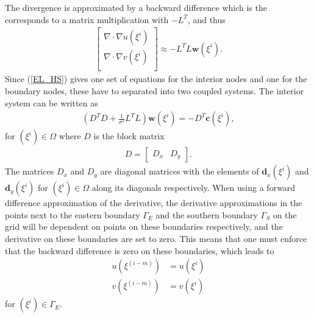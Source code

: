 The divergence is approximated by a backward difference which is the corresponds to a matrix multiplication with $-L^T$, and thus
\begin{align*}
 \begin{bmatrix}
         \nabla \cdot \nabla u(\xi^i) \\
         \nabla \cdot \nabla v(\xi^i)  \\
        \end{bmatrix} \approx -L^TL \textbf{w}(\xi^i).
\end{align*}
Since (\ref{EL_HS}) gives one set of equations for the interior nodes and one for the boundary nodes, these have to separated into two coupled systems. The interior system can be written as
\begin{align}
(D^T D + \frac{1}{\sigma^2} L^TL) \textbf{w}(\xi^i) = - D^T \textbf{c}(\xi^i),
\end{align}
for $(\xi^i) \in \Omega$ where $D$ is the block matrix
\begin{align*}
D = \left[
\begin{array}{c|c}
D_x & D_y
\end{array}
\right].
\end{align*}
The matrices $D_x$ and $D_y$ are diagonal matrices with the elements of $\textbf{d}_x(\xi^i)$ and $\textbf{d}_y(\xi^i)$ for $(\xi^i) \in \Omega$ along its diagonals respectively. When using a forward difference approximation of the derivative, the derivative approximations in the points next to the eastern boundary $\Gamma_E$ and the southern boundary $\Gamma_S$ on the grid will be dependent on points on these boundaries respectively, and the derivative on these boundaries are set to zero. This means that one must enforce  that the backward difference is zero on these boundaries, which leads to
\begin{align}
\label{neumann1}
u(\xi^{(i-m)}) &= u(\xi^{i})  \\
\label{neumann2}
v(\xi^{(i-m)}) &= v(\xi^{i})
\end{align}
for $(\xi^i) \in \Gamma_E$.

